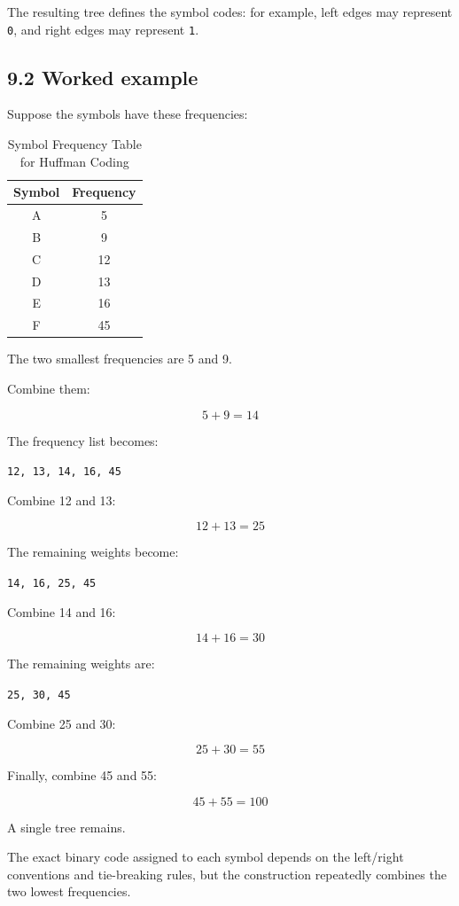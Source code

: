The resulting tree defines the symbol codes: for example, left edges may represent \texttt{0}, and right edges may represent \texttt{1}.

\subsection{9.2 Worked example}

Suppose the symbols have these frequencies:

\begin{table}[htbp]
\centering
\caption{Symbol Frequency Table for Huffman Coding}
\label{tab:huffman_symbols}
\begin{tabular}{cc}
\toprule
\textbf{Symbol} & \textbf{Frequency} \\
\midrule
A & 5 \\
B & 9 \\
C & 12 \\
D & 13 \\
E & 16 \\
F & 45 \\
\bottomrule
\end{tabular}
\end{table}

The two smallest frequencies are 5 and 9.

Combine them:


\[
5+9=14
\]


The frequency list becomes:

\texttt{12, 13, 14, 16, 45}

Combine 12 and 13:


\[
12+13=25
\]


The remaining weights become:

\texttt{14, 16, 25, 45}

Combine 14 and 16:


\[
14+16=30
\]


The remaining weights are:

\texttt{25, 30, 45}

Combine 25 and 30:


\[
25+30=55
\]


Finally, combine 45 and 55:


\[
45+55=100
\]


A single tree remains.

The exact binary code assigned to each symbol depends on the left/right conventions and tie-breaking rules, but the construction repeatedly combines the two lowest frequencies.

